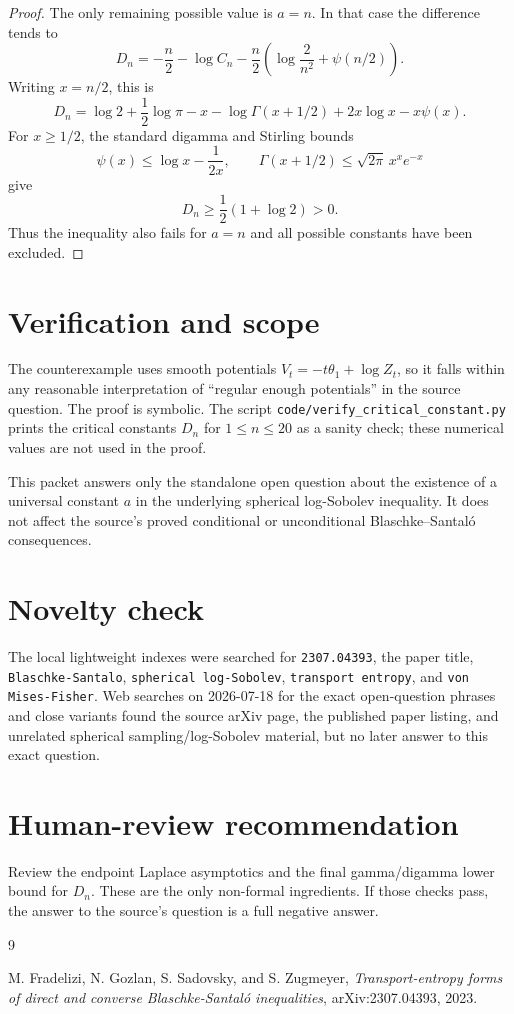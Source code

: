 \documentclass[11pt]{amsart}
\theoremstyle{remark}
\begin{document}
\begin{proof}
The only remaining possible value is $a=n$.  In that case the difference tends
to
\[
 D_n=
 -\frac n2-\log C_n
 -\frac n2\left(\log\frac{2}{n^2}+\psi(n/2)\right).
\]
Writing $x=n/2$, this is
\[
 D_n=
 \log2+\frac12\log\pi-x-\log\Gamma(x+1/2)+2x\log x-x\psi(x).
\]
For $x\geq1/2$, the standard digamma and Stirling bounds
\[
        \psi(x)\leq \log x-\frac{1}{2x},
        \qquad
        \Gamma(x+1/2)\leq \sqrt{2\pi}\,x^x e^{-x}
\]
give
\[
        D_n\geq \frac12(1+\log2)>0 .
\]
Thus the inequality also fails for $a=n$ and all possible constants have been
excluded.
\end{proof}

\section*{Verification and scope}

The counterexample uses smooth potentials $V_t=-t\theta_1+\log Z_t$, so it
falls within any reasonable interpretation of ``regular enough potentials'' in
the source question.  The proof is symbolic.  The script
\texttt{code/verify\_critical\_constant.py} prints the critical constants
$D_n$ for $1\leq n\leq20$ as a sanity check; these numerical values are not
used in the proof.

This packet answers only the standalone open question about the existence of a
universal constant $a$ in the underlying spherical log-Sobolev inequality.  It
does not affect the source's proved conditional or unconditional
Blaschke--Santal\'o consequences.

\section*{Novelty check}

The local lightweight indexes were searched for \texttt{2307.04393}, the paper
title, \texttt{Blaschke-Santalo}, \texttt{spherical log-Sobolev},
\texttt{transport entropy}, and \texttt{von Mises-Fisher}.  Web searches on
2026-07-18 for the exact open-question phrases and close variants found the
source arXiv page, the published paper listing, and unrelated spherical
sampling/log-Sobolev material, but no later answer to this exact question.

\section*{Human-review recommendation}

Review the endpoint Laplace asymptotics and the final gamma/digamma lower
bound for $D_n$.  These are the only non-formal ingredients.  If those checks
pass, the answer to the source's question is a full negative answer.

\begin{thebibliography}{9}

M. Fradelizi, N. Gozlan, S. Sadovsky, and S. Zugmeyer,
\emph{Transport-entropy forms of direct and converse Blaschke-Santal\'o
inequalities},
arXiv:2307.04393, 2023.

\end{thebibliography}
\end{document}
